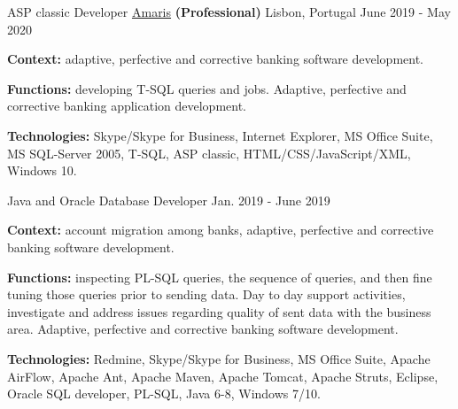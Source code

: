 \begin{cventries}

\vspace{-0.25cm}

  \cventry
    {ASP classic Developer} %
    {\href{https://www.amaris.com/}{Amaris} \textbf{(Professional)}} %
    {Lisbon, Portugal} %
    {June 2019 - May 2020} %
    {
      \begin{cvitems} %
		\item[] {\textbf{Context:} adaptive, perfective and corrective banking software development. 
}
		\item[] {\textbf{Functions:} developing T-SQL queries and jobs. Adaptive, perfective and corrective banking application development.}		
		\item[] {\textbf{Technologies:} \textcolor{rainbowcolor-olive}{Skype/Skype for Business}, \textcolor{rainbowcolor-olive}{Internet Explorer}, \textcolor{rainbowcolor-olive}{MS Office Suite}, \textcolor{rainbowcolor-olive}{MS SQL-Server 2005}, \textcolor{rainbowcolor-indigo}{T-SQL}, \textcolor{rainbowcolor-indigo}{ASP classic}, \textcolor{rainbowcolor-indigo}{HTML/CSS/JavaScript/XML},  \textcolor{rainbowcolor-orange}{Windows 10}.}		
      \end{cvitems}
    } 
    
  \cventry
    {Java and Oracle Database Developer} %
    {} %
    {} %
    {Jan. 2019 - June 2019} %
    {
      \begin{cvitems} %
		\item[] {\textbf{Context:} account migration among banks, adaptive, perfective and corrective banking software development. 
}
		\item[] {\textbf{Functions:} inspecting PL-SQL queries, the sequence of queries, and then fine tuning those queries prior to sending data. Day to day support activities, investigate and address issues regarding quality of sent data with the business area. Adaptive, perfective and corrective banking software development.}		
		\item[] {\textbf{Technologies:} \textcolor{rainbowcolor-olive}{Redmine}, \textcolor{rainbowcolor-olive}{Skype/Skype for Business}, \textcolor{rainbowcolor-olive}{MS Office Suite}, \textcolor{rainbowcolor-olive}{Apache AirFlow}, \textcolor{rainbowcolor-olive}{Apache Ant}, \textcolor{rainbowcolor-olive}{Apache Maven}, \textcolor{rainbowcolor-olive}{Apache Tomcat}, \textcolor{rainbowcolor-olive}{Apache Struts}, \textcolor{rainbowcolor-olive}{Eclipse}, \textcolor{rainbowcolor-olive}{Oracle SQL developer}, \textcolor{rainbowcolor-indigo}{PL-SQL}, \textcolor{rainbowcolor-indigo}{Java 6-8}, \textcolor{rainbowcolor-orange}{Windows 7/10}.}		
      \end{cvitems}
    } 
    

\end{cventries}
